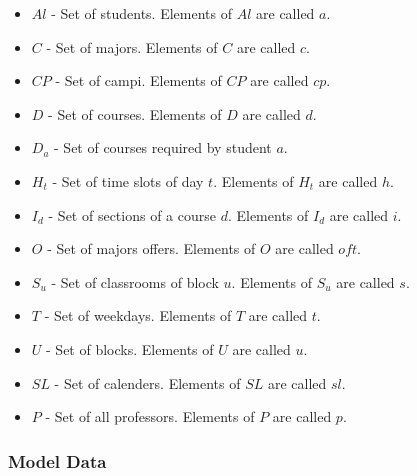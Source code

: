 \begin{itemize}
\item $Al$ - Set of students. Elements of $Al$ are called $a$.
\item $C$ - Set of majors. Elements of $C$ are called $c$.
\item $CP$ - Set of campi. Elements of $CP$ are called $cp$.
\item $D$ - Set of courses. Elements of $D$ are called $d$.
\item $D_{a}$ - Set of courses required by student $a$.
\item $H_{t}$ - Set of time slots of day $t$. Elements of $H_{t}$ are called $h$.
\item $I_{d}$ - Set of sections of a course $d$. Elements of $I_{d}$ are called $i$.
\item $O$ - Set of majors offers. Elements of $O$ are called $oft$.
\item $S_{u}$ - Set of classrooms of block $u$. Elements of $S_{u}$ are called $s$.
\item $T$ - Set of weekdays. Elements of $T$ are called $t$.
\item $U$ - Set of blocks. Elements of $U$ are called $u$.
\item $SL$ - Set of calenders. Elements of $SL$ are called $sl$.
\item $P$ - Set of all professors. Elements of $P$ are called $p$.
\end{itemize}

\subsubsection{Model Data}


